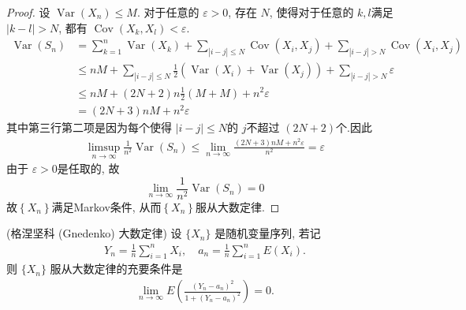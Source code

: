 \documentclass[../main.tex]{subfiles}
\begin{document}
\begin{proof}
设 $\operatorname{Var}\left(X_{n}\right)\le M$.
对于任意的 $\varepsilon > 0$, 存在 $N$, 使得对于任意的 $k,l$满足 $\left| k-l \right|> N$, 都有 $\operatorname{Cov}\left(X_{k},X_{l}\right)<  \varepsilon$. 
 $$ \begin{aligned} \operatorname{Var}\left(S_{n}\right)&=\sum _{k= 1}^{n}\operatorname{Var}\left(X_{k}\right)+ \sum _{\left| i-j \right|\le N }\operatorname{Cov}\left(X_{i},X_{j}\right)+ \sum _{\left| i-j \right|> N }\operatorname{Cov}\left(X_{i},X_{j}\right) \\&\le nM+ \sum _{\left| i-j \right|\le N }\frac{1}{2}\left(\operatorname{Var}\left(X_{i}\right)+ \operatorname{Var}\left(X_{j}\right)\right)+ \sum _{\left| i-j \right|> N }\varepsilon \\&\le nM+ \left(2N+ 2\right)n \frac{1}{2}\left(M+ M\right)+ n^{2}\varepsilon \\&= \left(2N+ 3\right)nM+ n^{2}\varepsilon \end{aligned} $$
其中第三行第二项是因为每个使得 $\left| i-j \right|\le N$的 $j$不超过 $\left(2N+ 2\right)$个.因此
 $$ \begin{aligned}\limsup_{n\to \infty} \frac{1 }{n^{2} }\operatorname{Var}\left(S_{n}\right)\le \lim_{n\to \infty}\frac{\left(2N+ 3\right)nM+ n^{2}\varepsilon  }{n^{2} } = \varepsilon \end{aligned} $$  
由于 $\varepsilon > 0$是任取的, 故
 $$ \lim_{n\to \infty}\frac{1 }{n^{2} }\operatorname{Var}\left(S_{n}\right)= 0 $$
故$\left\{X_{n}\right\}$满足Markov条件, 从而$\left\{ X_{n} \right\}$服从大数定律. 
\end{proof}
\begin{exercise}{(格涅坚科 (Gnedenko) 大数定律)}{}
设 $\{X_n\}$ 是随机变量序列, 若记
$$
\begin{aligned}
Y_n = \frac{1}{n} \sum_{i=1}^n X_i, \quad a_n = \frac{1}{n} \sum_{i=1}^n E(X_i).
\end{aligned}
$$
则 $\{X_n\}$ 服从大数定律的充要条件是
$$
\begin{aligned}
\lim_{n \to \infty} E\left( \frac{(Y_n - a_n)^2}{1 + (Y_n - a_n)^2} \right) = 0.
\end{aligned}
$$
\end{exercise}
\end{document}
